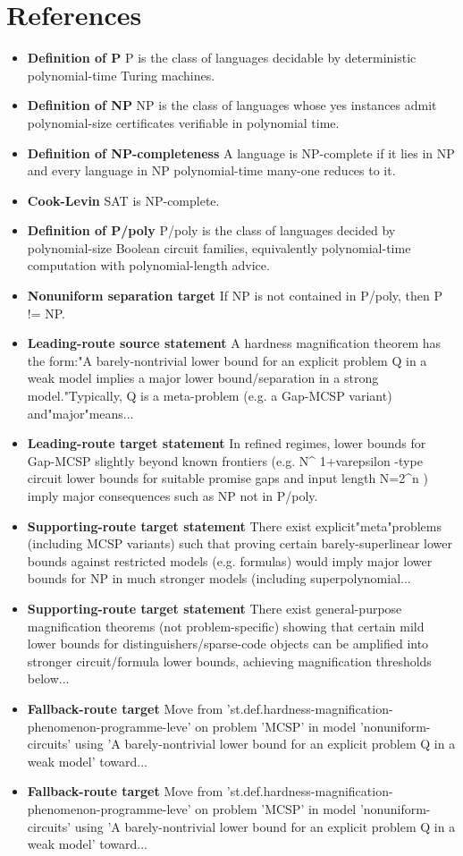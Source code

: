 \documentclass[11pt]{article}
\begin{document}
\section{References}
\begin{itemize}[leftmargin=1.5em]
\item \textbf{Definition of P} P is the class of languages decidable by deterministic polynomial-time Turing machines.
\item \textbf{Definition of NP} NP is the class of languages whose yes instances admit polynomial-size certificates verifiable in polynomial time.
\item \textbf{Definition of NP-completeness} A language is NP-complete if it lies in NP and every language in NP polynomial-time many-one reduces to it.
\item \textbf{Cook-Levin} SAT is NP-complete.
\item \textbf{Definition of P/poly} P/poly is the class of languages decided by polynomial-size Boolean circuit families, equivalently polynomial-time computation with polynomial-length advice.
\item \textbf{Nonuniform separation target} If NP is not contained in P/poly, then P != NP.
\item \textbf{Leading-route source statement} A hardness magnification theorem has the form:"A barely-nontrivial lower bound for an explicit problem Q in a weak model implies a major lower bound/separation in a strong model."Typically, Q is a meta-problem (e.g. a Gap-MCSP variant) and"major"means...
\item \textbf{Leading-route target statement} In refined regimes, lower bounds for Gap-MCSP slightly beyond known frontiers (e.g. N\textasciicircum{} 1+varepsilon -type circuit lower bounds for suitable promise gaps and input length N=2\textasciicircum{}n ) imply major consequences such as NP not in P/poly.
\item \textbf{Supporting-route target statement} There exist explicit"meta"problems (including MCSP variants) such that proving certain barely-superlinear lower bounds against restricted models (e.g. formulas) would imply major lower bounds for NP in much stronger models (including superpolynomial...
\item \textbf{Supporting-route target statement} There exist general-purpose magnification theorems (not problem-specific) showing that certain mild lower bounds for distinguishers/sparse-code objects can be amplified into stronger circuit/formula lower bounds, achieving magnification thresholds below...
\item \textbf{Fallback-route target} Move from 'st.def.hardness-magnification-phenomenon-programme-leve' on problem 'MCSP' in model 'nonuniform-circuits' using 'A barely-nontrivial lower bound for an explicit problem Q in a weak model' toward...
\item \textbf{Fallback-route target} Move from 'st.def.hardness-magnification-phenomenon-programme-leve' on problem 'MCSP' in model 'nonuniform-circuits' using 'A barely-nontrivial lower bound for an explicit problem Q in a weak model' toward...
\end{itemize}
\end{document}
